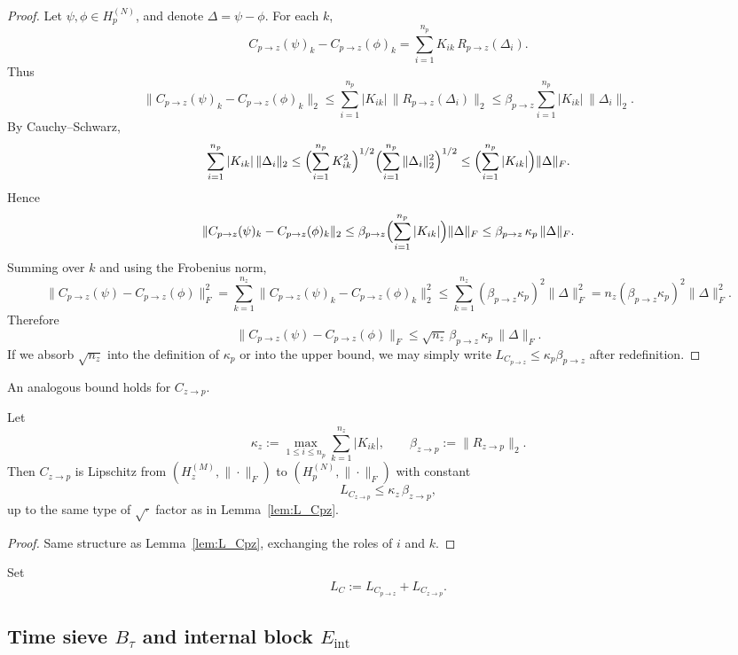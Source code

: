 \documentclass[11pt]{article}
\theoremstyle{definition}
\theoremstyle{plain}
\begin{document}
\begin{proof}
Let $\psi,\phi\in H_p^{(N)}$, and denote $\Delta = \psi - \phi$.
For each $k$,
\[
  C_{p\to z}(\psi)_k - C_{p\to z}(\phi)_k
  = \sum_{i=1}^{n_p} K_{ik}\,R_{p\to z}(\Delta_i).
\]
Thus
\[
  \|C_{p\to z}(\psi)_k - C_{p\to z}(\phi)_k\|_2
  \le \sum_{i=1}^{n_p} |K_{ik}|\,\|R_{p\to z}(\Delta_i)\|_2
  \le \beta_{p\to z} \sum_{i=1}^{n_p} |K_{ik}|\,\|\Delta_i\|_2.
\]
By Cauchy–Schwarz,
\[
  \sum_{i=1}^{n_p} |K_{ik}|\,\|\Delta_i\|_2
  \le \Bigl(\sum_{i=1}^{n_p} K_{ik}^2\Bigr)^{1/2}
      \Bigl(\sum_{i=1}^{n_p} \|\Delta_i\|_2^2\Bigr)^{1/2}
  \le \Bigl(\sum_{i=1}^{n_p} |K_{ik}|\Bigr)\|\Delta\|_F.
\]
Hence
\[
  \|C_{p\to z}(\psi)_k - C_{p\to z}(\phi)_k\|_2
  \le \beta_{p\to z}
      \Bigl(\sum_{i=1}^{n_p} |K_{ik}|\Bigr)\|\Delta\|_F
  \le \beta_{p\to z}\,\kappa_p\,\|\Delta\|_F.
\]
Summing over $k$ and using the Frobenius norm,
\[
  \|C_{p\to z}(\psi) - C_{p\to z}(\phi)\|_F^2
  = \sum_{k=1}^{n_z} \|C_{p\to z}(\psi)_k - C_{p\to z}(\phi)_k\|_2^2
  \le \sum_{k=1}^{n_z} (\beta_{p\to z}\kappa_p)^2 \|\Delta\|_F^2
  = n_z (\beta_{p\to z}\kappa_p)^2 \|\Delta\|_F^2.
\]
Therefore
\[
  \|C_{p\to z}(\psi) - C_{p\to z}(\phi)\|_F
  \le \sqrt{n_z}\,\beta_{p\to z}\,\kappa_p\,\|\Delta\|_F.
\]
If we absorb $\sqrt{n_z}$ into the definition of $\kappa_p$ or into the upper bound, we may simply write $L_{C_{p\to z}}\le \kappa_p\beta_{p\to z}$ after redefinition.
\end{proof}

An analogous bound holds for $C_{z\to p}$.

\begin{lemma}\label{lem:L_Czp}
Let
\[
  \kappa_z := \max_{1\le i\le n_p} \sum_{k=1}^{n_z} |K_{ik}|,
  \qquad
  \beta_{z\to p} := \|R_{z\to p}\|_{2}.
\]
Then $C_{z\to p}$ is Lipschitz from $(H_z^{(M)},\|\cdot\|_F)$ to $(H_p^{(N)},\|\cdot\|_F)$ with constant
\[
  L_{C_{z\to p}} \le \kappa_z\,\beta_{z\to p},
\]
up to the same type of $\sqrt{\cdot}$ factor as in Lemma~\ref{lem:L_Cpz}.
\end{lemma}

\begin{proof}
Same structure as Lemma~\ref{lem:L_Cpz}, exchanging the roles of $i$ and $k$.
\end{proof}

Set
\[
  L_C := L_{C_{p\to z}} + L_{C_{z\to p}}.
\]

\subsection{Time sieve \texorpdfstring{$B_\tau$}{Btau} and internal block \texorpdfstring{$E_{\mathrm{int}}$}{Eint}}
\end{document}
